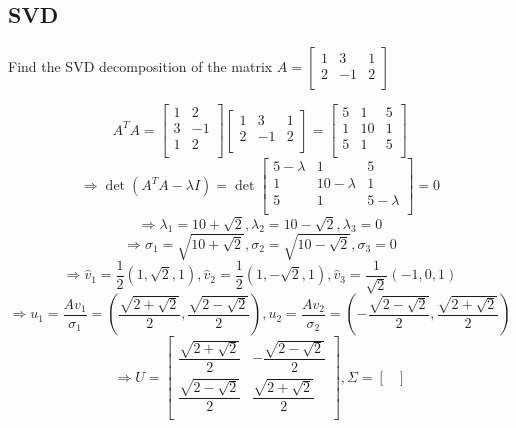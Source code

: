 \subsection{SVD}
Find the SVD decomposition of the matrix $A = 
\begin{bmatrix}
    1 & 3 & 1 \\
    2 & -1 & 2 \\
\end{bmatrix}$
\begin{qsolve}
	\begin{qsolve}[]
		$$A^T A =\begin{bmatrix}
			1 & 2   \\
			3 & -1  \\
			1 & 2   \\
		\end{bmatrix}  \begin{bmatrix}
			1 & 3 & 1 \\
			2 & -1 & 2 \\
				\end{bmatrix} = \begin{bmatrix}
					5 & 1 & 5\\
					1 & 10 & 1\\
					5 & 1 & 5\\
				\end{bmatrix}$$
		$$\Rightarrow \det(A^T A - \lambda I) = \det\begin{bmatrix}
			5-\lambda & 1 & 5\\
			1 & 10-\lambda & 1\\
			5 & 1 & 5-\lambda\\
		\end{bmatrix} = 0$$
		$$\Rightarrow \lambda_1 = 10+\sqrt{2} , \lambda_2 = 10-\sqrt{2} , \lambda_3 = 0$$
		$$\Rightarrow \sigma_1 = \sqrt{10+\sqrt{2}} , \sigma_2 = \sqrt{10-\sqrt{2}} , \sigma_3 = 0$$
		$$\Rightarrow \hat{v}_1 = \frac{1}{2}(1,\sqrt{2},1) , \hat{v}_2 = \frac{1}{2}(1,-\sqrt{2},1) , \hat{v}_3 = \frac{1}{\sqrt{2}}(-1,0,1)$$
		$$\Rightarrow u_1 = \dfrac{Av_1}{\sigma_1} = (\dfrac{\sqrt{2+\sqrt{2}}}{2} , \dfrac{\sqrt{2-\sqrt{2}}}{2}) , u_2 = \dfrac{Av_2}{\sigma_2} = (-\dfrac{\sqrt{2-\sqrt{2}}}{2} , \dfrac{\sqrt{2+\sqrt{2}}}{2}) $$
		\splitqsolve[\splitqsolve]
		$$\Rightarrow U = \begin{bmatrix}
			\dfrac{\sqrt{2+\sqrt{2}}}{2} & -\dfrac{\sqrt{2-\sqrt{2}}}{2} \\
			\dfrac{\sqrt{2-\sqrt{2}}}{2} & \dfrac{\sqrt{2+\sqrt{2}}}{2} \\
		\end{bmatrix} , \Sigma = \begin{bmatrix}

\end{bmatrix}$$
\end{qsolve}
\end{qsolve}
